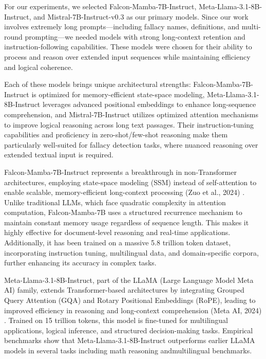 For our experiments, we selected Falcon-Mamba-7B-Instruct, Meta-Llama-3.1-8B-Instruct, and Mistral-7B-Instruct-v0.3 as our primary models. Since our work involves extremely long prompts—including fallacy names, definitions, and multi-round prompting—we needed models with strong long-context retention and instruction-following capabilities. These models were chosen for their ability to process and reason over extended input sequences while maintaining efficiency and logical coherence.
\par
Each of these models brings unique architectural strengths: Falcon-Mamba-7B-Instruct is optimized for memory-efficient state-space modeling, Meta-Llama-3.1-8B-Instruct leverages advanced positional embeddings to enhance long-sequence comprehension, and Mistral-7B-Instruct utilizes optimized attention mechanisms to improve logical reasoning across long text passages. Their instruction-tuning capabilities and proficiency in zero-shot/few-shot reasoning make them particularly well-suited for fallacy detection tasks, where nuanced reasoning over extended textual input is required.
\par
Falcon-Mamba-7B-Instruct represents a breakthrough in non-Transformer architectures, employing state-space modeling (SSM) instead of self-attention to enable scalable, memory-efficient long-context processing (Zuo et al., 2024) \cite{zuo2024falconmambacompetitiveattentionfree}. Unlike traditional LLMs, which face quadratic complexity in attention computation, Falcon-Mamba-7B uses a structured recurrence mechanism to maintain constant memory usage regardless of sequence length. This makes it highly effective for document-level reasoning and real-time applications. Additionally, it has been trained on a massive 5.8 trillion token dataset, incorporating instruction tuning, multilingual data, and domain-specific corpora, further enhancing its accuracy in complex tasks.
\par
Meta-Llama-3.1-8B-Instruct, part of the LLaMA (Large Language Model Meta AI) family, extends Transformer-based architectures by integrating Grouped Query Attention (GQA) and Rotary Positional Embeddings (RoPE), leading to improved efficiency in reasoning and long-context comprehension (Meta AI, 2024) \cite{grattafiori2024llama3herdmodels} . Trained on 15 trillion tokens, this model is fine-tuned for multilingual applications, logical inference, and structured decision-making tasks. Empirical benchmarks show that Meta-Llama-3.1-8B-Instruct outperforms earlier LLaMA models in several tasks including math reasoning andmultilingual benchmarks.
